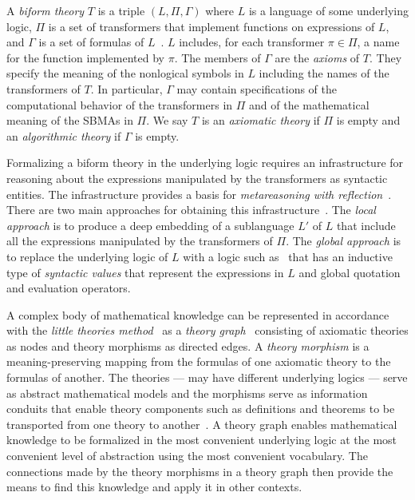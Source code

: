 \documentclass[fleqn]{llncs}
\begin{document}
A \emph{biform theory} $T$ is a triple $(L,\Pi,\Gamma)$ where $L$ is a
language of some underlying logic, $\Pi$ is a set of transformers that
implement functions on expressions of $L$, and $\Gamma$ is a set of
formulas of
$L$~\cite{CaretteFarmer08,Farmer07b,FarmerMohrenschildt03}.  $L$
includes, for each transformer $\pi \in \Pi$, a name for the function
implemented by $\pi$.  The members of $\Gamma$ are the \emph{axioms}
of $T$.  They specify the meaning of the nonlogical symbols in $L$
including the names of the transformers of $T$.  In particular,
$\Gamma$ may contain specifications of the computational behavior of
the transformers in $\Pi$ and of the mathematical meaning of the SBMAs
in $\Pi$.  We say $T$ is an \emph{axiomatic theory} if $\Pi$ is empty
and an \emph{algorithmic theory} if $\Gamma$ is empty.

Formalizing a biform theory in the underlying logic requires an
infrastructure for reasoning about the expressions manipulated by the
transformers as syntactic entities.  The infrastructure provides a
basis for \emph{metareasoning with reflection}~\cite{FarmerArxiv16}.
There are two main approaches for obtaining this
infrastructure~\cite{Farmer13}.  The \emph{local approach} is to
produce a deep embedding of a sublanguage $L'$ of $L$ that include all
the expressions manipulated by the transformers of $\Pi$.  The
\emph{global approach} is to replace the underlying logic of $L$ with
a logic such as~\cite{FarmerArxiv16} that has an inductive
type of \emph{syntactic values} that represent the expressions in $L$
and global quotation and evaluation operators.

A complex body of mathematical knowledge can be represented in
accordance with the \emph{little theories method}~\cite{FarmerEtAl92b}
as a \emph{theory graph}~\cite{Kohlhase14} consisting of axiomatic
theories as nodes and theory morphisms as directed edges.  A
\emph{theory morphism} is a meaning-preserving mapping from the
formulas of one axiomatic theory to the formulas of another.  The
theories --- may have different underlying logics --- serve as
abstract mathematical models and the morphisms serve as information
conduits that enable theory components such as definitions and
theorems to be transported from one theory to
another~\cite{BarwiseSeligman97}.  A theory graph enables mathematical
knowledge to be formalized in the most convenient underlying logic at
the most convenient level of abstraction using the most convenient
vocabulary.  The connections made by the theory morphisms in a theory
graph then provide the means to find this knowledge and apply it in
other contexts.
\end{document}
